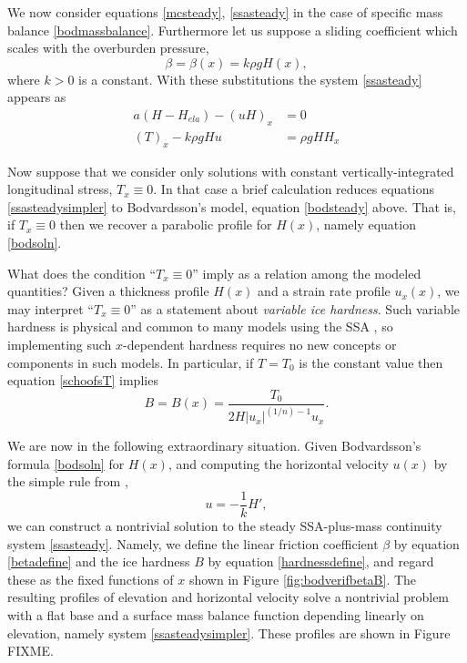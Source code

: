 \documentclass[twocolumn,letterpaper]{igs}
\begin{document}
We now consider equations \eqref{mcsteady}, \eqref{ssasteady} in the case of specific mass balance \eqref{bodmassbalance}.
Furthermore let us suppose a sliding coefficient which scales with the overburden pressure,
\begin{equation}
\beta = \beta(x) = k \rho g H(x),\label{betadefine}
\end{equation}
where $k>0$ is a constant.  With these substitutions the system \eqref{ssasteady} appears as
\begin{align}
a(H-H_{ela}) - (u H)_x &= 0 \label{mcsteadysimpler} \\
\left(T\right)_x - k \rho g H u &= \rho g H H_x \label{ssasteadysimpler}
\end{align}

Now suppose that we consider only solutions with constant vertically-integrated longitudinal stress, $T_x \equiv 0$.  In that case a brief calculation reduces equations \eqref{ssasteadysimpler} to Bodvardsson's model, equation \eqref{bodsteady} above.  That is, if $T_x \equiv 0$ then we recover a parabolic profile for $H(x)$, namely equation \eqref{bodsoln}.

What does the condition ``$T_x\equiv 0$'' imply as a relation among the modeled quantities?  Given a thickness profile $H(x)$ and a strain rate profile $u_x(x)$, we may interpret ``$T_x\equiv 0$'' as a statement about \emph{variable ice hardness}.  Such variable hardness is physical and common to many models using the SSA \citep{BBssasliding}, so implementing such $x$-dependent hardness requires no new concepts or components in such models.  In particular, if $T=T_0$ is the constant value then equation \eqref{schoofsT} implies
\begin{equation}
B = B(x) = \frac{T_0}{2 H |u_x|^{(1/n)-1} u_x}. \label{hardnessdefine}
\end{equation}

We are now in the following extraordinary situation.  Given Bodvardsson's formula \eqref{bodsoln} for $H(x)$, and computing the horizontal velocity $u(x)$ by the simple rule from \cite{Bodvardsson},
	$$u = -\frac{1}{k} H',$$
we can construct a nontrivial solution to the steady SSA-plus-mass continuity system \eqref{ssasteady}.  Namely, we define the linear friction coefficient $\beta$ by equation \eqref{betadefine} and the ice hardness $B$ by equation \eqref{hardnessdefine}, and regard these as the fixed functions of $x$ shown in Figure \ref{fig:bodverifbetaB}.  The resulting profiles of elevation and horizontal velocity solve a nontrivial problem with a flat base and a surface mass balance function depending linearly on elevation, namely system \eqref{ssasteadysimpler}.  These profiles are shown in Figure FIXME.
\end{document}
